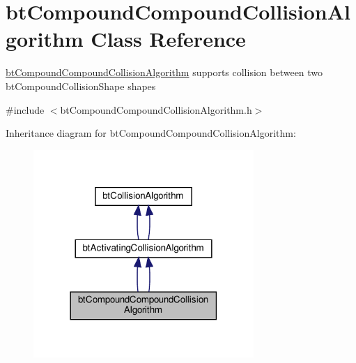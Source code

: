 \hypertarget{classbtCompoundCompoundCollisionAlgorithm}{}\section{bt\+Compound\+Compound\+Collision\+Algorithm Class Reference}
\label{classbtCompoundCompoundCollisionAlgorithm}


\hyperlink{classbtCompoundCompoundCollisionAlgorithm}{bt\+Compound\+Compound\+Collision\+Algorithm} supports collision between two bt\+Compound\+Collision\+Shape shapes  




{\ttfamily \#include $<$bt\+Compound\+Compound\+Collision\+Algorithm.\+h$>$}



Inheritance diagram for bt\+Compound\+Compound\+Collision\+Algorithm\+:
\nopagebreak
\begin{figure}[H]
\begin{center}
\leavevmode
\includegraphics[width=237pt]{classbtCompoundCompoundCollisionAlgorithm__inherit__graph}
\end{center}
\end{figure}


